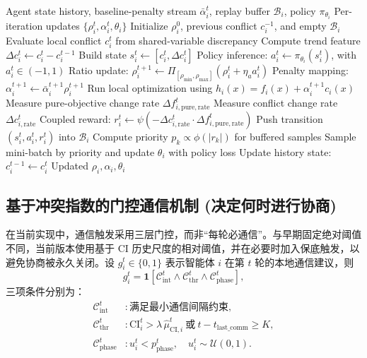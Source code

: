 \documentclass[conference]{IEEEtran}
\begin{document}
\begin{algorithm}[t]
  \footnotesize
  \caption{RL-Based Adaptive Penalty Update (Abstract)}
  \label{alg:rl_penalty_update}
  \begin{algorithmic}[1]
  \Require Agent state history, baseline-penalty stream $\bar{\alpha}_i^t$, replay buffer $\mathcal{B}_i$, policy $\pi_{\theta_i}$
  \Ensure Per-iteration updates $\{\rho_i^t,\alpha_i^t,\theta_i\}$
  \State Initialize $\rho_i^0$, previous conflict $c_i^{-1}$, and empty $\mathcal{B}_i$
    \State Evaluate local conflict $c_i^t$ from shared-variable discrepancy
    \State Compute trend feature $\Delta c_i^t \gets c_i^t-c_i^{t-1}$
    \State Build state $s_i^t \gets [c_i^t,\Delta c_i^t]$
    \State Policy inference: $a_i^t \gets \pi_{\theta_i}(s_i^t)$, with $a_i^t\in(-1,1)$
    \State Ratio update: $\rho_i^{t+1}\gets \Pi_{[\rho_{\min},\rho_{\max}]}\!\left(\rho_i^t+\eta_a a_i^t\right)$
    \State Penalty mapping: $\alpha_i^{t+1}\gets \bar{\alpha}_i^{t+1}\rho_i^{t+1}$
    \State Run local optimization using $h_i(x)=f_i(x)+\alpha_i^{t+1}c_i(x)$
    \State Measure pure-objective change rate $\Delta f_{i,\mathrm{pure,rate}}^t$
    \State Measure conflict change rate $\Delta c_{i,\mathrm{rate}}^t$
    \State Coupled reward:
    \Statex \hspace{1.5em}$r_i^t\gets \psi\!\left(-\Delta c_{i,\mathrm{rate}}^t\cdot \Delta f_{i,\mathrm{pure,rate}}^t\right)$
    \State Push transition $(s_i^t,a_i^t,r_i^t)$ into $\mathcal{B}_i$
      \State Compute priority $p_k\propto \phi(|r_k|)$ for buffered samples
      \State Sample mini-batch by priority and update $\theta_i$ with policy loss
    \EndIf
    \State Update history state: $c_i^{t-1}\gets c_i^t$
  \EndFor
  \State \Return Updated $\rho_i,\alpha_i,\theta_i$
  \end{algorithmic}
  \end{algorithm}

\subsection{基于冲突指数的门控通信机制 (决定何时进行协商)}\label{ux57faux4e8eux51b2ux7a81ux6307ux6570ux7684ux95e8ux63a7ux901aux4fe1ux673aux5236-ux51b3ux5b9aux4f55ux65f6ux8fdbux884cux534fux5546}

在当前实现中，通信触发采用三层门控，而非“每轮必通信”。与早期固定绝对阈值不同，当前版本使用基于 CI 历史尺度的相对阈值，并在必要时加入保底触发，以避免协商被永久关闭。设 $g_i^t\in\{0,1\}$ 表示智能体 $i$ 在第 $t$ 轮的本地通信建议，则
\[
g_i^t=\mathbf{1}\!\left[\mathcal{C}_{\mathrm{int}}^t\land \mathcal{C}_{\mathrm{thr}}^t\land \mathcal{C}_{\mathrm{phase}}^t\right],
\]
三项条件分别为：
\begin{align}
\mathcal{C}_{\mathrm{int}}^t &: \text{满足最小通信间隔约束},\\
\mathcal{C}_{\mathrm{thr}}^t &: \mathrm{CI}_i^t > \lambda\,\hat{\mu}_{\mathrm{CI},i}^t\ \text{或}\ t-t_{\mathrm{last\_comm}}\ge K,\\
\mathcal{C}_{\mathrm{phase}}^t &: u_i^t < p_{\mathrm{phase}}^t,\quad u_i^t\sim\mathcal{U}(0,1).
\end{align}
\end{document}
